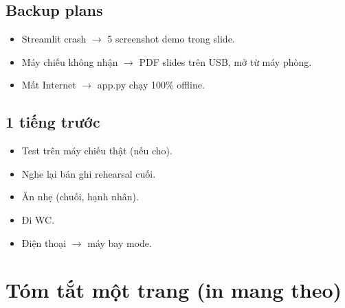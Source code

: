 \documentclass[11pt,a4paper]{article}
\begin{document}
\subsection{Backup plans}
\begin{itemize}[leftmargin=*, itemsep=2pt]
  \item Streamlit crash $\to$ 5 screenshot demo trong slide.
  \item Máy chiếu không nhận $\to$ PDF slides trên USB, mở từ máy phòng.
  \item Mất Internet $\to$ app.py chạy 100\% offline.
\end{itemize}

\subsection{1 tiếng trước}
\begin{itemize}[leftmargin=*, itemsep=2pt]
  \item Test trên máy chiếu thật (nếu cho).
  \item Nghe lại bản ghi rehearsal cuối.
  \item Ăn nhẹ (chuối, hạnh nhân).
  \item Đi WC.
  \item Điện thoại $\to$ máy bay mode.
\end{itemize}

\section{Tóm tắt một trang (in mang theo)}
\end{document}
